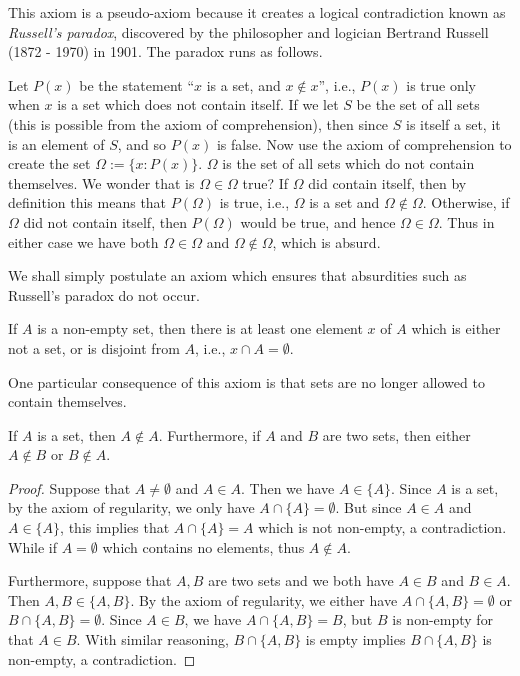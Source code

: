 This axiom is a pseudo-axiom because it creates a logical contradiction known as \emph{Russell's paradox}, discovered by the philosopher and logician Bertrand Russell (1872 - 1970) in 1901. The paradox runs as follows.

Let $P(x)$ be the statement ``$x$ is a set, and $x \notin x$'', i.e., $P(x)$ is true only when $x$ is a set which does not contain itself. If we let $S$ be the set of all sets (this is possible from the axiom of comprehension), then since $S$ is itself a set, it is an element of $S$, and so $P(x)$ is false. Now use the axiom of comprehension to create the set $\Omega := \{x : P(x)\}$. $\Omega$ is the set of all sets which do not contain themselves. We wonder that is $\Omega \in \Omega$ true? If $\Omega$ did contain itself, then by definition this means that $P(\Omega)$ is true, i.e., $\Omega$ is a set and $\Omega \notin \Omega$. Otherwise, if $\Omega$ did not contain itself, then $P(\Omega)$ would be true, and hence $\Omega \in \Omega$. Thus in either case we have both $\Omega \in \Omega$ and $\Omega \notin \Omega$, which is absurd.

We shall simply postulate an axiom which ensures that absurdities such as Russell's paradox do not occur.

\begin{axiom}\label{axiom:regularity}
    If $A$ is a non-empty set, then there is at least one element $x$ of $A$ which is either not a set, or is disjoint from $A$, i.e., $x \cap A = \emptyset$.
\end{axiom}

One particular consequence of this axiom is that sets are no longer allowed to contain themselves.

\begin{lemma}
    If $A$ is a set, then $A \notin A$. Furthermore, if $A$ and $B$ are two sets, then either $A \notin B$ or $B \notin A$.
\end{lemma}

\begin{proof}
Suppose that $A \neq \emptyset$ and $A \in A$. Then we have $A \in \{A\}$. Since $A$ is a set, by the axiom of regularity, we only have $A \cap \{A\} = \emptyset$. But since $A \in A$ and $A \in \{A\}$, this implies that $A \cap \{A\} = A$ which is not non-empty, a contradiction. While if $A = \emptyset$ which contains no elements, thus $A \notin A$.

Furthermore, suppose that $A, B$ are two sets and we both have $A \in B$ and $B \in A$. Then $A,B \in \{A, B\}$. By the axiom of regularity, we either have $A \cap \{A, B\} = \emptyset$ or $B \cap \{A,B\} = \emptyset$. Since $A \in B$, we have $A \cap \{A, B\} = B$, but $B$ is non-empty for that $A \in B$. With similar reasoning, $B \cap \{A,B\}$ is empty implies $B \cap \{A,B\}$ is non-empty, a contradiction.
\end{proof}

